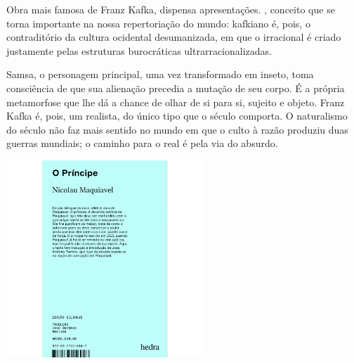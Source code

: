 \hspace*{-7cm}\hrulefill\hspace*{-7cm}

\medskip

\noindent{}Obra mais famosa de Franz Kafka, {} dispensa apresentações. , conceito que se torna importante na nossa repertoriação do mundo: kafkiano é, pois, o contraditório da cultura ocidental desumanizada, em que o irracional é criado justamente pelas estruturas burocráticas ultrarracionalizadas.

Samsa, o personagem principal, uma vez transformado em inseto, toma consciência de que sua alienação precedia a mutação de seu corpo. É a própria metamorfose que lhe dá a chance de olhar de si para si, sujeito e objeto. Franz Kafka é, pois, um realista, do único tipo que o século  comporta. O naturalismo do século  não faz mais sentido no mundo em que o culto à razão produziu duas guerras mundiais; o caminho para o real é pela via do absurdo.


\vfill

\hspace*{-.4cm}\begin{minipage}[c]{.5\linewidth}
\small{
{}}
\end{minipage}


\pagebreak %

\begin{center}
\hspace*{-3.6cm}
\hspace*{3.1cm}\includegraphics[width=74mm]{./grid/maquiavel.jpg}
\end{center}

